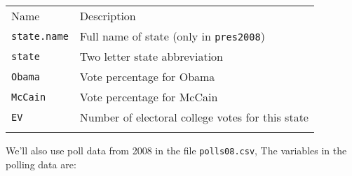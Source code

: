 \documentclass[]{article}
\begin{document}
\begin{longtable}[c]{@{}ll@{}}
\toprule\addlinespace
\begin{minipage}[b]{0.25\columnwidth}\raggedright
Name
\end{minipage} & \begin{minipage}[b]{0.68\columnwidth}\raggedright
Description
\end{minipage}
\\\addlinespace
\midrule\endhead
\begin{minipage}[t]{0.25\columnwidth}\raggedright
\texttt{state.name}
\end{minipage} & \begin{minipage}[t]{0.68\columnwidth}\raggedright
Full name of state (only in \texttt{pres2008})
\end{minipage}
\\\addlinespace
\begin{minipage}[t]{0.25\columnwidth}\raggedright
\texttt{state}
\end{minipage} & \begin{minipage}[t]{0.68\columnwidth}\raggedright
Two letter state abbreviation
\end{minipage}
\\\addlinespace
\begin{minipage}[t]{0.25\columnwidth}\raggedright
\texttt{Obama}
\end{minipage} & \begin{minipage}[t]{0.68\columnwidth}\raggedright
Vote percentage for Obama
\end{minipage}
\\\addlinespace
\begin{minipage}[t]{0.25\columnwidth}\raggedright
\texttt{McCain}
\end{minipage} & \begin{minipage}[t]{0.68\columnwidth}\raggedright
Vote percentage for McCain
\end{minipage}
\\\addlinespace
\begin{minipage}[t]{0.25\columnwidth}\raggedright
\texttt{EV}
\end{minipage} & \begin{minipage}[t]{0.68\columnwidth}\raggedright
Number of electoral college votes for this state
\end{minipage}
\\\addlinespace
\bottomrule
\end{longtable}

We'll also use poll data from 2008 in the file \texttt{polls08.csv}, The
variables in the polling data are:
\end{document}
